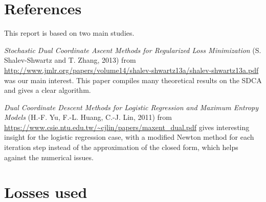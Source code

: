 \documentclass{article}
\begin{document}
\newpage
\section*{References}


This report is based on two main studies.

\textit{Stochastic Dual Coordinate Ascent Methods for Regularized Loss Minimization} 
(S. Shalev-Shwartz and T. Zhang, 2013)
from \url{http://www.jmlr.org/papers/volume14/shalev-shwartz13a/shalev-shwartz13a.pdf}
was our main interest. This paper compiles many theoretical results on the SDCA and gives a clear algorithm.

\textit{Dual Coordinate Descent Methods for Logistic Regression and Maximum Entropy Models} 
(H.-F. Yu, F.-L. Huang, C.-J. Lin, 2011) 
from \url{https://www.csie.ntu.edu.tw/~cjlin/papers/maxent_dual.pdf}
gives interesting insight for the logistic regression case, with a modified Newton method 
for each iteration step instead of the approximation of the closed form, which helps against 
the numerical issues.


\newpage
\appendix


\section{Losses used}
\label{appendix-losses}
\end{document}
